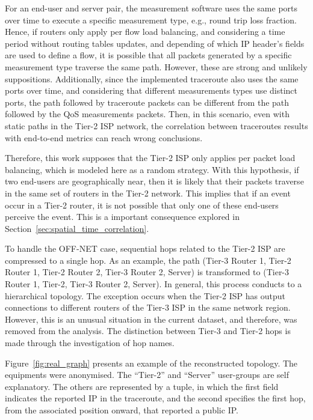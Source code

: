 For an end-user and server pair,
the measurement software uses the same ports over time to execute a specific
measurement type, e.g., round trip loss fraction.
Hence, if routers only apply per flow load balancing,
and considering a time period without routing tables updates, and
depending of which IP header's fields are used to define a flow, it is possible
that all packets generated by a specific measurement type traverse the same
path. However, these are strong and unlikely suppositions.
Additionally, since the implemented traceroute also uses the same ports over
time, and considering that different measurements types use distinct ports,
the
path followed by traceroute packets can be different from the path followed by
the QoS measurements packets. Then, in this scenario, even with static paths in
the Tier-2 ISP network, the correlation between traceroutes
results with end-to-end metrics can reach wrong conclusions.

Therefore, this work supposes that the Tier-2 ISP only applies per packet load
balancing, which is modeled here as a random strategy. With this hypothesis,
if two end-users are geographically near, then it is likely that their packets
traverse in the same set of routers in the Tier-2 network. This implies that if
an event occur in a Tier-2 router, it is not possible that only one of these
end-users perceive the event. This is a important consequence explored in
Section~\ref{sec:spatial_time_correlation}.

To handle the OFF-NET case, sequential hops related to
the Tier-2 ISP are compressed to a single hop.
As an example, the path (Tier-3 Router 1, Tier-2 Router 1, Tier-2 Router 2,
Tier-3 Router 2, Server) is
transformed to (Tier-3 Router 1, Tier-2, Tier-3 Router 2, Server).
In general, this process conducts to a hierarchical topology.
The exception occurs when the Tier-2 ISP has output connections to
different routers of the Tier-3 ISP in the same network region.
However, this is an unusual situation in
the current dataset, and therefore, was removed from the analysis.
The distinction between
Tier-3 and Tier-2 hops is made through the investigation of hop names.

Figure~\ref{fig:real_graph} presents an example of the reconstructed
topology. The equipments were anonymised. The ``Tier-2'' and ``Server''
user-groups are self explanatory. The others are represented by a tuple, in
which the first field indicates the reported IP in the traceroute, and the
second specifies the first hop, from the associated position onward,
that reported a public IP\@.

